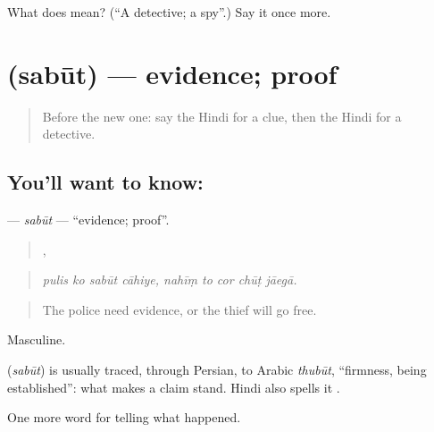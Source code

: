 \begin{tcolorbox}[breakable,colback=teal!4,colframe=teal!35!black,title={Before you move on}]
What does  mean? (\textquotedblleft{}A detective; a spy\textquotedblright{}.) Say it once more.
\end{tcolorbox}
\section[\texorpdfstring{\hi{सबूत} (sabūt)}{सबूत (sabūt)}]{ (sabūt) — evidence; proof}

\label{lesson:HI-C294-sabut}



\begin{quote}
Before the new one: say the Hindi for a clue, then the Hindi for a detective.
\end{quote}

\subsection*{You'll want to know: }
\textbf{} — \emph{sabūt} — \textquotedblleft{}evidence; proof\textquotedblright{}.

\begin{quote}
   ,     
\end{quote}

\begin{quote}
\emph{pulis ko sabūt cāhiye, nahīṃ to cor chūṭ jāegā.}
\end{quote}

\begin{quote}
The police need evidence, or the thief will go free.
\end{quote}

Masculine.

\begin{cousinweb}
\textbf{} (\emph{sabūt}) is usually traced, through Persian, to Arabic \emph{thubūt}, \textquotedblleft{}firmness, being established\textquotedblright{}: what makes a claim stand. Hindi also spells it \textbf{}.
\end{cousinweb}

\begin{grammarlens}[title={What you've built}]
One more word for telling what happened.
\end{grammarlens}

